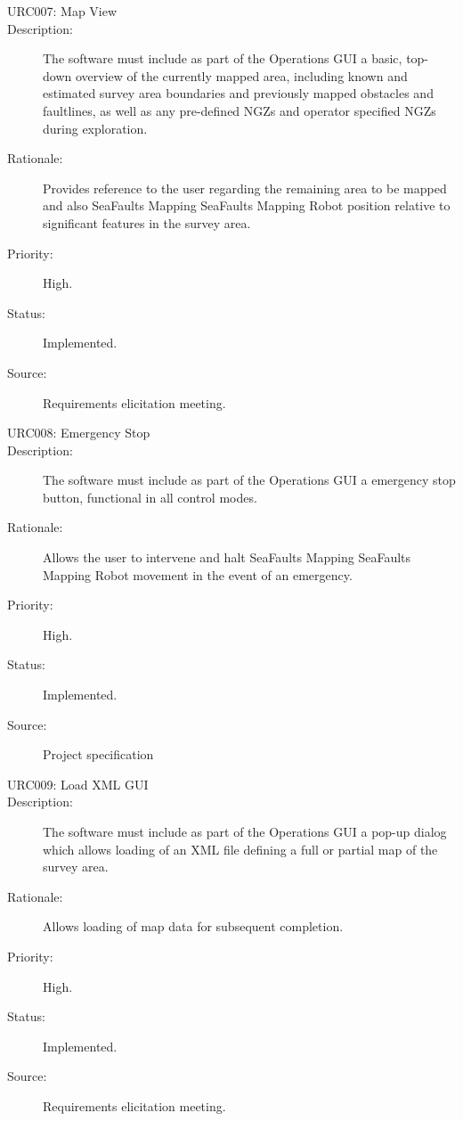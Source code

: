 \documentclass[12pt]{article}
\begin{document}
\begin{description}
\item [{URC007: Map View}\label{URC007}] 
\item [{Description: }\label{Description}] The software must include as part of the Operations GUI a basic, top-down overview of the currently mapped area, including known and estimated survey area boundaries and previously mapped obstacles and faultlines, as well as any pre-defined NGZs and operator specified NGZs during exploration. 
\item[{Rationale: }\label{Rationale}] Provides reference to the user regarding the remaining area to be mapped and also SeaFaults Mapping SeaFaults Mapping Robot position relative to significant features in the survey area.
\item[{Priority: }\label{Priority}] High.
\item[{Status: }\label{Status}] Implemented.
\item[{Source: }\label{Source}] Requirements elicitation meeting.

\item [{URC008: Emergency Stop}\label{URC008}] 
\item [{Description: }\label{Description}] The software must include as part of the Operations GUI a emergency stop button, functional in all control modes. 
\item[{Rationale: }\label{Rationale}] Allows the user to intervene and halt SeaFaults Mapping SeaFaults Mapping Robot movement in the event of an emergency.
\item[{Priority: }\label{Priority}] High.
\item[{Status: }\label{Status}] Implemented.
\item[{Source: }\label{Source}] Project specification \cite{spec}

\item [{URC009: Load XML GUI}\label{URC009}] 
\item [{Description: }\label{Description}] The software must include as part of the Operations GUI a pop-up dialog which allows loading of an XML file defining a full or partial map of the survey area.
\item[{Rationale: }\label{Rationale}] Allows loading of map data for subsequent completion.
\item[{Priority: }\label{Priority}] High.
\item[{Status: }\label{Status}] Implemented.
\item[{Source: }\label{Source}] Requirements elicitation meeting.

\end{description}
\end{document}

